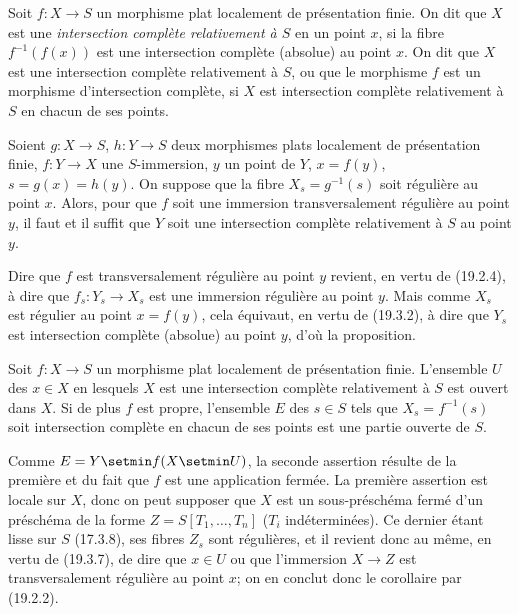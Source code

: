\begin{definition}[19.3.6]
Soit $f:X\to S$ un morphisme \textup{plat} localement de présentation finie. On dit que $X$ est une \emph{intersection complète relativement à $S$} en un point $x$, si la fibre $f^{-1}(f(x))$ est une intersection complète (absolue) au point $x$. On dit que $X$ est une intersection complète relativement à $S$, ou que le morphisme $f$ est un morphisme d'intersection complète, si $X$ est intersection complète relativement à $S$ en chacun de ses points.
\end{definition}

\begin{proposition}[19.3.7]
\label{IV.19.3.7}
Soient $g:X\to S$, $h:Y\to S$ deux morphismes plats localement de présentation finie, $f:Y\to X$ une $S$-immersion, $y$ un point de $Y$, $x=f(y)$, $s=g(x)=h(y)$. On suppose que la fibre $X_s=g^{-1}(s)$ soit régulière au point $x$. Alors, pour que $f$ soit une immersion transversalement régulière au point $y$, il faut et il suffit que $Y$ soit une intersection complète relativement à $S$ au point $y$.
\end{proposition}

Dire que $f$ est transversalement régulière au point $y$ revient, en vertu de (19.2.4), à dire que $f_s:Y_s\to X_s$ est une immersion régulière au point $y$. Mais comme $X_s$ est régulier au point $x=f(y)$, cela équivaut, en vertu de (19.3.2), à dire que $Y_s$ est intersection complète (absolue) au point $y$, d'où la proposition.

\begin{corollary}[19.3.8]
\label{IV.19.3.8}
Soit $f:X\to S$ un morphisme plat localement de présentation finie. L'ensemble $U$ des $x\in X$ en lesquels $X$ est une intersection complète relativement à $S$ est ouvert dans $X$. Si de plus $f$ est propre, l'ensemble $E$ des $s\in S$ tels que $X_s=f^{-1}(s)$ soit intersection complète en chacun de ses points est une partie ouverte de $S$.
\end{corollary}

Comme $E=Y\setmin f(X\setmin U)$, la seconde assertion résulte de la première et du fait que $f$ est une application fermée. La première assertion est locale sur $X$, donc on peut supposer que $X$ est un sous-préschéma fermé d'un préschéma de la forme $Z=S[T_1,\ldots,T_n]$ ($T_i$ indéterminées). Ce dernier étant lisse sur $S$ (17.3.8), ses fibres $Z_s$ sont régulières, et il revient donc au même, en vertu de (19.3.7), de dire que $x\in U$ ou que l'immersion $X\to Z$ est transversalement régulière au point $x$; on en conclut donc le corollaire par (19.2.2).

